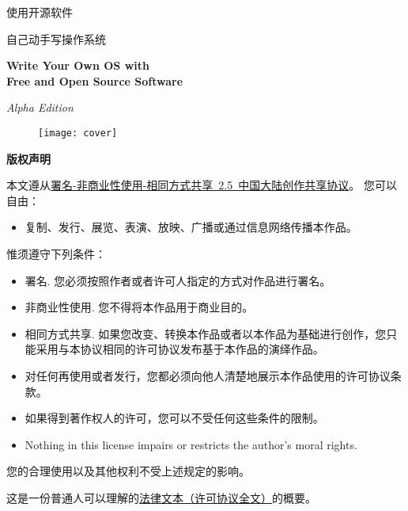 \begin{center}
\Huge 使用开源软件

\fontsize{48}{52}\selectfont 自己动手写操作系统

\bf\sc\Huge Write Your Own OS with\\ Free and Open Source Software

\it\LARGE Alpha Edition

\end{center}
\vskip 1cm
\begin{figure}[htbp]
 \centering
\texttt{[image: cover]}
\end{figure}

\noindent{}
\noindent{}
\clearpage

\begin{lined}{\textwidth}\vspace{2ex}
\begin{center}
\bf\Large 版权声明
\end{center}
\vspace{2ex}
\end{lined}

\normalsize
本文遵从\href{http://creativecommons.org/licenses/by-nc-sa/2.5/cn/}{署名-非商业性使用-相同方式共享~2.5~中国大陆创作共享协议}。
\vskip 1cm
\noindent
\large 您可以自由：
\normalsize
\begin{itemize}
\item 复制、发行、展览、表演、放映、广播或通过信息网络传播本作品。
\end{itemize}

\noindent
\large 惟须遵守下列条件：
\normalsize
\begin{itemize}
\item{署名.} 您必须按照作者或者许可人指定的方式对作品进行署名。
\item{非商业性使用.} 您不得将本作品用于商业目的。
\item{相同方式共享.} 如果您改变、转换本作品或者以本作品为基础进行创作，您只能采用与本协议相同的许可协议发布基于本作品的演绎作品。
\item 对任何再使用或者发行，您都必须向他人清楚地展示本作品使用的许可协议条款。
\item 如果得到著作权人的许可，您可以不受任何这些条件的限制。
\item Nothing in this license impairs or restricts the author's moral rights.
\end{itemize}
\vskip 1cm
\normalsize
\begin{center}
您的合理使用以及其他权利不受上述规定的影响。

这是一份普通人可以理解的\href{http://creativecommons.org/licenses/by-nc-sa/2.5/cn/legalcode}{法律文本（许可协议全文）}的概要。 
\end{center}

